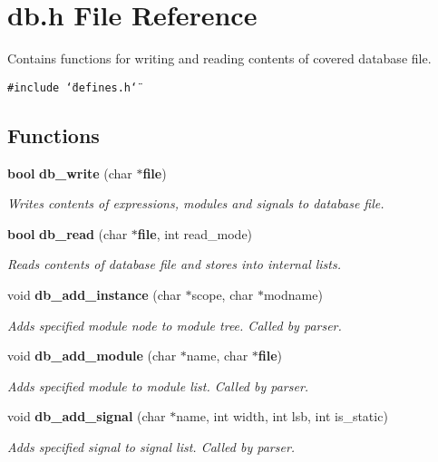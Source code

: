 \section{db.h File Reference}
\label{db_8h}
Contains functions for writing and reading contents of covered database file. 


{\tt \#include \char`\"{}defines.h\char`\"{}}\par
\subsection*{Functions}
\begin{CompactItemize}
\item 
{\bf bool} {\bf db\_\-write} (char $\ast${\bf file})
\begin{CompactList}\small\item\em Writes contents of expressions, modules and signals to database file.\item\end{CompactList}\item 
{\bf bool} {\bf db\_\-read} (char $\ast${\bf file}, int read\_\-mode)
\begin{CompactList}\small\item\em Reads contents of database file and stores into internal lists.\item\end{CompactList}\item 
void {\bf db\_\-add\_\-instance} (char $\ast$scope, char $\ast$modname)
\begin{CompactList}\small\item\em Adds specified module node to module tree. Called by parser.\item\end{CompactList}\item 
void {\bf db\_\-add\_\-module} (char $\ast$name, char $\ast${\bf file})
\begin{CompactList}\small\item\em Adds specified module to module list. Called by parser.\item\end{CompactList}\item 
void {\bf db\_\-add\_\-signal} (char $\ast$name, int width, int lsb, int is\_\-static)
\begin{CompactList}\small\item\em Adds specified signal to signal list. Called by parser.\item\end{CompactList}\item 

\end{CompactItemize}
